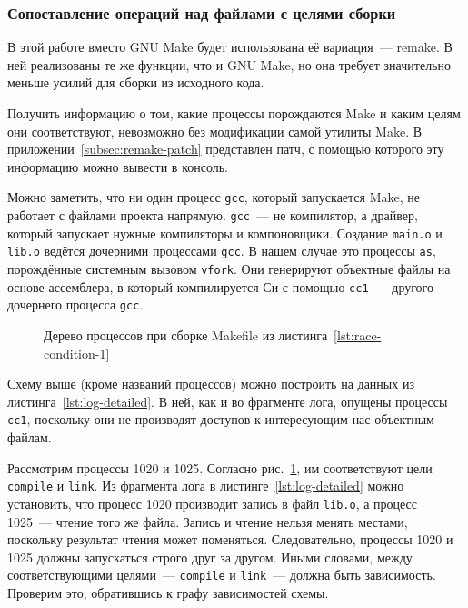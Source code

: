 \subsubsection{Сопоставление операций над файлами с целями сборки}
\label{subsubsec:link-ops-with-targets}

В этой работе вместо GNU Make будет использована её вариация~--- remake. В ней реализованы те же функции, что и GNU Make, но она требует значительно меньше усилий для сборки из исходного кода.

Получить информацию о том, какие процессы порождаются Make и каким целям они соответствуют, невозможно без модификации самой утилиты Make. В приложении~\ref{subsec:remake-patch} представлен патч, с помощью которого эту информацию можно вывести в консоль.



Можно заметить, что ни один процесс \texttt{gcc}, который запускается Make, не работает с файлами проекта напрямую. \texttt{gcc}~--- не компилятор, а драйвер, который запускает нужные компиляторы и компоновщики. Создание \texttt{main.o} и \texttt{lib.o} ведётся дочерними процессами \texttt{gcc}. В нашем случае это процессы \texttt{as}, порождённые системным вызовом \texttt{vfork}. Они генерируют объектные файлы на основе ассемблера, в который компилируется Си с помощью \texttt{cc1}~--- другого дочернего процесса \texttt{gcc}.

\begin{figure}[H]
	\centering
    
    \caption{Дерево процессов при сборке Makefile из листинга~\ref{lst:race-condition-1}}
    \label{fig:pstree1}
\end{figure}

Схему выше (кроме названий процессов) можно построить на данных из листинга~\ref{lst:log-detailed}. В ней, как и во фрагменте лога, опущены процессы \texttt{cc1}, поскольку они не производят доступов к интересующим нас объектным файлам.

Рассмотрим процессы 1020 и 1025. Согласно рис.~\ref{fig:pstree1}, им соответствуют цели \texttt{compile} и \texttt{link}. Из фрагмента лога в листинге~\ref{lst:log-detailed} можно установить, что процесс 1020 производит запись в файл \texttt{lib.o}, а процесс 1025~--- чтение того же файла. Запись и чтение нельзя менять местами, поскольку результат чтения может поменяться. Следовательно, процессы 1020 и 1025 должны запускаться строго друг за другом. Иными словами, между соответствующими целями~--- \texttt{compile} и \texttt{link}~--- должна быть зависимость. Проверим это, обратившись к графу зависимостей схемы.

